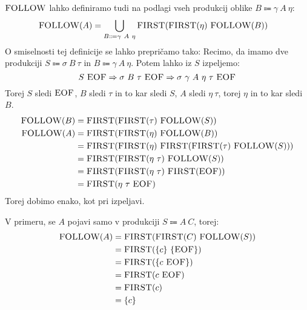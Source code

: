 \documentclass{article}
\newcommand{\FIRST}{\textsc{FIRST}}
\newcommand{\FOLLOW}{\textsc{FOLLOW}}
\newcommand{\EOF}{\textsc{EOF}}
\newcommand{\Arrow}{\Coloneqq}
\newcommand{\Derive}{\Rightarrow}
\newcommand{\Seq}{\ }
\begin{document}
$\FOLLOW$ lahko definiramo tudi na podlagi vseh produkcij oblike ${B \Arrow \gamma \Seq A \Seq \eta}$:
\begin{align*}
  \FOLLOW(A) &= \bigcup_{B \Arrow \gamma \Seq A \Seq \eta} \FIRST(\FIRST(\eta) \Seq \FOLLOW(B))
\end{align*}
O smiselnosti tej definicije se lahko prepričamo tako:
Recimo, da imamo dve produkciji $S \Arrow \sigma \Seq B \Seq \tau$ in $B \Arrow \gamma \Seq A \Seq \eta$.
Potem lahko iz $S$ izpeljemo:
\begin{equation*}
  S \Seq \EOF \Derive \sigma \Seq B \Seq \tau \Seq \EOF \Derive \sigma \Seq \gamma \Seq A \Seq \eta \Seq \tau \Seq \EOF
\end{equation*}
Torej $S$ sledi $\EOF$, $B$ sledi $\tau$ in to kar sledi $S$, $A$ sledi $\eta \Seq \tau$, torej $\eta$ in to kar sledi $B$.
\begin{align*}
  \FOLLOW(B) &= \FIRST(\FIRST(\tau) \Seq \FOLLOW(S))\\
  \FOLLOW(A) &= \FIRST(\FIRST(\eta) \Seq \FOLLOW(B))\\
   &= \FIRST(\FIRST(\eta) \Seq \FIRST(\FIRST(\tau) \Seq \FOLLOW(S)))\\
   &= \FIRST(\FIRST(\eta \Seq \tau) \Seq \FOLLOW(S))\\
   &= \FIRST(\FIRST(\eta \Seq \tau) \Seq \FIRST(\EOF))\\
   &= \FIRST(\eta \Seq \tau \Seq \EOF)
\end{align*}
Torej dobimo enako, kot pri izpeljavi.

V primeru, se $A$ pojavi samo v produkciji $S \Arrow A \Seq C$, torej:
\begin{align*}
  \FOLLOW(A) &= \FIRST(\FIRST(C) \Seq \FOLLOW(S)) \\
             &= \FIRST(\{c\} \Seq \{\EOF\})\\
             &= \FIRST(\{c \Seq \EOF\})\\
             &= \FIRST(c \Seq \EOF) \\
             &= \FIRST(c) \\
             &= \{c\}
\end{align*}
\end{document}
